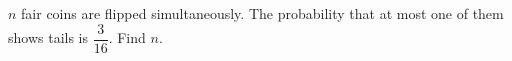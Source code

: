 $n$ fair coins are flipped simultaneously. The probability that at most one of them shows tails is $\dfrac{3}{16}$. Find $n$.
